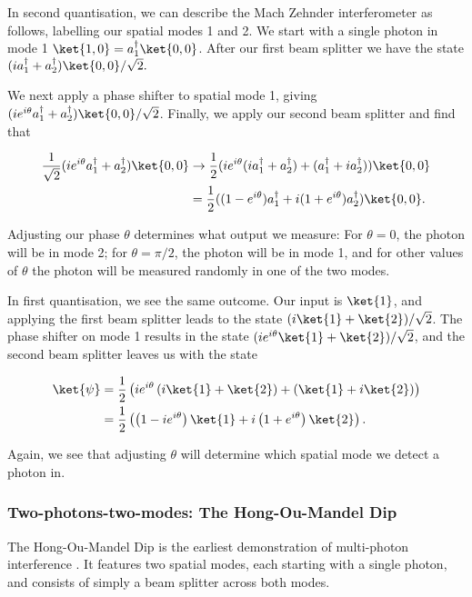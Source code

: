 In second quantisation, we can describe the Mach Zehnder interferometer as follows, labelling our spatial modes 1 and 2. We start with a single photon in mode 1 $\ket{1,0} = a_1^\dagger\ket{0,0}$. After our first beam splitter we have the state $(ia_1^\dagger + a_2^\dagger)\ket{0,0}/\sqrt{2}.$

We next apply a phase shifter to spatial mode 1, giving $(ie^{i\theta}a_1^\dagger + a_2^\dagger)\ket{0,0}/\sqrt{2}$. Finally, we apply our second beam splitter and find that

\begin{align}
\frac{1}{\sqrt{2}}(ie^{i\theta}a_1^\dagger + a_2^\dagger)\ket{0,0} &\rightarrow \frac{1}{2}(ie^{i\theta}(ia_1^\dagger+a_2^\dagger) + (a_1^\dagger + ia_2^\dagger))\ket{0,0}\\
&= \frac{1}{2}((1-e^{i\theta})a_1^\dagger+i(1+e^{i\theta})a_2^\dagger)\ket{0,0}.
\end{align}

Adjusting our phase $\theta$ determines what output we measure: For $\theta=0$, the photon will be in mode 2; for $\theta=\pi/2$, the photon will be in mode 1, and for other values of $\theta$ the photon will be measured randomly in one of the two modes.

In first quantisation, we see the same outcome. Our input is $\ket{1}$, and  applying the first beam splitter leads to the state $(i\ket{1}+\ket{2})/\sqrt{2}$. The phase shifter on mode 1 results in the state $(ie^{i\theta}\ket{1}+\ket{2})/\sqrt{2}$, and the second beam splitter leaves us with the state

\begin{align}
\ket{\psi} &= \frac{1}{2}\left(ie^{i\theta}\left(i\ket{1} + \ket{2}\right) + \left(\ket{1} + i\ket{2}\right)\right)\\
&= \frac{1}{2}\left(\left(1-ie^{i\theta}\right)\ket{1} + i\left(1+e^{i\theta}\right)\ket{2}\right).
\end{align}

Again, we see that adjusting $\theta$ will determine which spatial mode we detect a photon in.

\subsubsection{Two-photons-two-modes: The Hong-Ou-Mandel Dip}

The Hong-Ou-Mandel Dip is the earliest demonstration of multi-photon interference \cite{hong1987}. It features two spatial modes, each starting with a single photon, and consists of simply a beam splitter across both modes.

